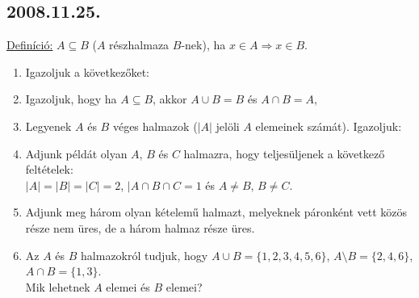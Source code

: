 \subsection*{2008.11.25.}
\underline{Definíció:} $A{\subseteq}B$ ($A$ részhalmaza $B$-nek),
ha $x{\in}A \Rightarrow x{\in}B$.
\begin{enumerate}
\item Igazoljuk a következőket:

\item Igazoljuk, hogy ha $A{\subseteq}B$, akkor $A{\cup}B=B$ és $A{\cap}B{=}A$,

\item Legyenek $A$ és $B$ véges halmazok ($|A|$ jelöli $A$ elemeinek számát). Igazoljuk:

\item Adjunk példát olyan $A$, $B$ és $C$ halmazra, hogy teljesüljenek a következő feltételek:\\
$|A|{=}|B|{=}|C|{=}2$, $|A{\cap}B{\cap}C{=}1$ és $A{\not=}B$, $B{\not=}C$.

\item Adjunk meg három olyan kételemű halmazt, melyeknek páronként vett közös része nem üres, de a három halmaz része üres.

\item Az $A$ és $B$ halmazokról tudjuk, hogy 
$A{\cup}B{=}\{1,2,3,4,5,6\}$, $A{\setminus}B{=}\{2,4,6\}$, $A{\cap}B{=}\{1,3\}$.\\
Mik lehetnek $A$ elemei és $B$ elemei?
\end{enumerate}


